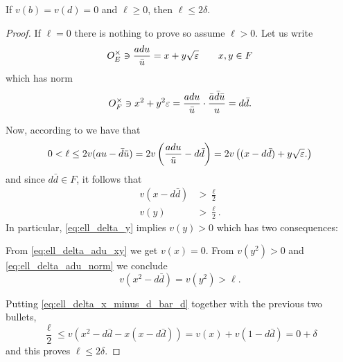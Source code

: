 \begin{lemma}
  If $v(b) = v(d) = 0$ and $\ell \ge 0$, then $\ell \le 2 \delta$.
  \label{lem:ell_le_2_delta}
\end{lemma}
\begin{proof}
  If $\ell = 0$ there is nothing to prove so assume $\ell > 0$.
  Let us write
  \begin{equation}
    O_E^\times \ni \frac{a d u}{\bar u} = x + y \sqrt{\varepsilon} \qquad x,y \in F
    \label{eq:ell_delta_adu_xy}
  \end{equation}
  which has norm
  \begin{equation}
    O_F^\times \ni x^2+y^2\varepsilon
    = \frac{a d u}{\bar u} \cdot \frac{\bar a \bar d \bar u}{u} = d \bar d.
    \label{eq:ell_delta_adu_norm}
  \end{equation}

  Now, according to  we have that
  \[ 0 < \ell \le 2v(au - \bar d \bar u)
    = 2v\left( \frac{a d u}{\bar u} - d \bar d \right)
    = 2v\left(  (x - d \bar d) + y \sqrt{\varepsilon}. \right) \]
  and since $d \bar d \in F$, it follows that
  \begin{align}
    v\left( x - d \bar d \right) &> \frac{\ell}{2} \label{eq:ell_delta_x_minus_d_bar_d} \\
    v(y) &> \frac{\ell}{2}. \label{eq:ell_delta_y}
  \end{align}
  In particular, \eqref{eq:ell_delta_y} implies $v(y) > 0$ which has two consequences:
  \begin{itemize}
    \ii From \eqref{eq:ell_delta_adu_xy} we get $v(x) = 0$.
    \ii From $v(y^2) > 0$ and \eqref{eq:ell_delta_adu_norm}
    we conclude \[ v(x^2 - d \bar d) = v(y^2) > \ell. \]
  \end{itemize}
  Putting \eqref{eq:ell_delta_x_minus_d_bar_d} together with the previous two bullets,
  \[ \frac{\ell}{2} \le v\left( x^2 - d \bar d - x(x - d \bar d) \right)
    = v(x) + v(1-d \bar d) = 0 + \delta \]
  and this proves $\ell \le 2\delta$.
\end{proof}

